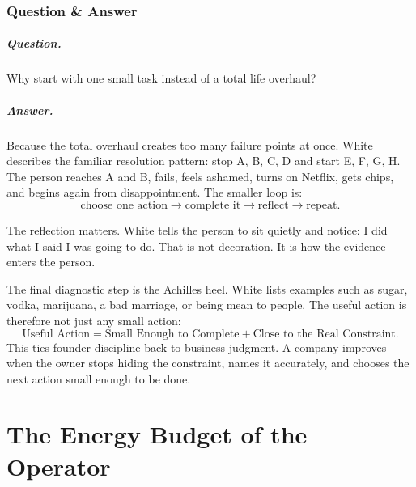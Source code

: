 \documentclass[11pt,oneside]{book}
\begin{document}
\subsection{Question \& Answer}

\paragraph{Question.}
Why start with one small task instead of a total life overhaul?

\paragraph{Answer.}
Because the total overhaul creates too many failure points at once. White describes the familiar resolution pattern: stop A, B, C, D and start E, F, G, H. The person reaches A and B, fails, feels ashamed, turns on Netflix, gets chips, and begins again from disappointment. The smaller loop is:
\[
\text{choose one action}
\longrightarrow
\text{complete it}
\longrightarrow
\text{reflect}
\longrightarrow
\text{repeat}.
\]

The reflection matters. White tells the person to sit quietly and notice: I did what I said I was going to do. That is not decoration. It is how the evidence enters the person.

The final diagnostic step is the Achilles heel. White lists examples such as sugar, vodka, marijuana, a bad marriage, or being mean to people. The useful action is therefore not just any small action:
\[
\text{Useful Action}
=
\text{Small Enough to Complete}
+
\text{Close to the Real Constraint}.
\]
This ties founder discipline back to business judgment. A company improves when the owner stops hiding the constraint, names it accurately, and chooses the next action small enough to be done.


\chapter{The Energy Budget of the Operator}
\end{document}
